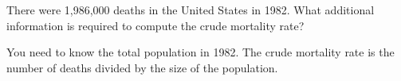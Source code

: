 
There were 1,986,000 deaths in the United States in 1982.  What additional information is required to compute the crude mortality rate?
\answerSpace{1in}

\begin{AnswerText}
You need to know the total population in 1982.  The crude mortality rate is the number of deaths divided by the size of the population.
\end{AnswerText}

